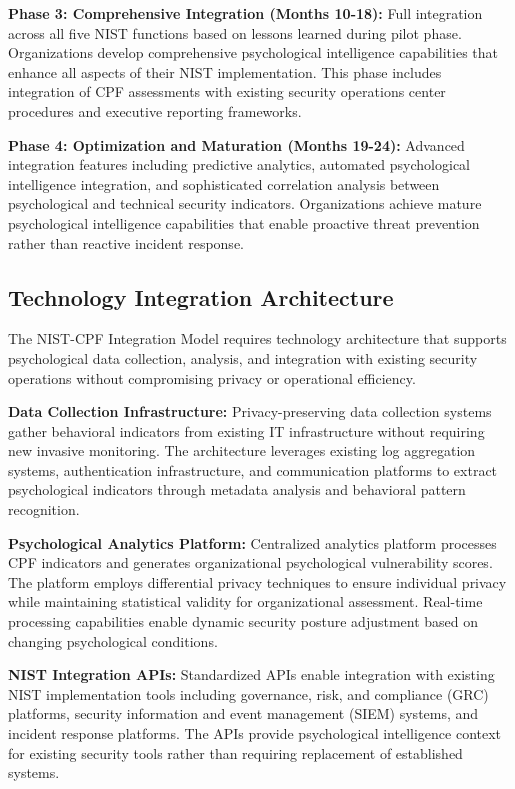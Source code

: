 \documentclass[10pt, twocolumn]{article}
\begin{document}
\textbf{Phase 3: Comprehensive Integration (Months 10-18):} Full integration across all five NIST functions based on lessons learned during pilot phase. Organizations develop comprehensive psychological intelligence capabilities that enhance all aspects of their NIST implementation. This phase includes integration of CPF assessments with existing security operations center procedures and executive reporting frameworks.

\textbf{Phase 4: Optimization and Maturation (Months 19-24):} Advanced integration features including predictive analytics, automated psychological intelligence integration, and sophisticated correlation analysis between psychological and technical security indicators. Organizations achieve mature psychological intelligence capabilities that enable proactive threat prevention rather than reactive incident response.

\subsection{Technology Integration Architecture}

The NIST-CPF Integration Model requires technology architecture that supports psychological data collection, analysis, and integration with existing security operations without compromising privacy or operational efficiency.

\textbf{Data Collection Infrastructure:} Privacy-preserving data collection systems gather behavioral indicators from existing IT infrastructure without requiring new invasive monitoring. The architecture leverages existing log aggregation systems, authentication infrastructure, and communication platforms to extract psychological indicators through metadata analysis and behavioral pattern recognition.

\textbf{Psychological Analytics Platform:} Centralized analytics platform processes CPF indicators and generates organizational psychological vulnerability scores. The platform employs differential privacy techniques to ensure individual privacy while maintaining statistical validity for organizational assessment. Real-time processing capabilities enable dynamic security posture adjustment based on changing psychological conditions.

\textbf{NIST Integration APIs:} Standardized APIs enable integration with existing NIST implementation tools including governance, risk, and compliance (GRC) platforms, security information and event management (SIEM) systems, and incident response platforms. The APIs provide psychological intelligence context for existing security tools rather than requiring replacement of established systems.
\end{document}
